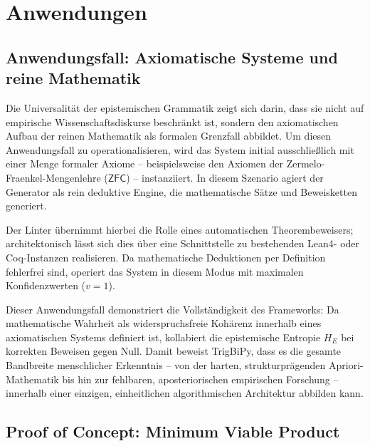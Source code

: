 \documentclass[11pt, a4paper]{article}
\begin{document}
	\section{Anwendungen}
	
	\subsection{Anwendungsfall: Axiomatische Systeme und reine Mathematik} \label{math}
	
	Die Universalität der epistemischen Grammatik zeigt sich darin, dass sie nicht auf empirische Wissenschaftsdiskurse beschränkt ist, sondern den axiomatischen Aufbau der reinen Mathematik als formalen Grenzfall abbildet. Um diesen Anwendungsfall zu operationalisieren, wird das System initial ausschließlich mit einer Menge formaler Axiome – beispielsweise den Axiomen der Zermelo-Fraenkel-Mengenlehre ($\mathsf{ZFC}$) – instanziiert. In diesem Szenario agiert der Generator als rein deduktive Engine, die mathematische Sätze und Beweisketten generiert.
	
	Der Linter übernimmt hierbei die Rolle eines automatischen Theorembeweisers; architektonisch lässt sich dies über eine Schnittstelle zu bestehenden Lean4- oder Coq-Instanzen realisieren. Da mathematische Deduktionen per Definition fehlerfrei sind, operiert das System in diesem Modus mit maximalen Konfidenzwerten ($v = 1$). 
	
	Dieser Anwendungsfall demonstriert die Vollständigkeit des Frameworks: Da mathematische Wahrheit als widerspruchsfreie Kohärenz innerhalb eines axiomatischen Systems definiert ist, kollabiert die epistemische Entropie $H_E$ bei korrekten Beweisen gegen Null. Damit beweist TrigBiPy, dass es die gesamte Bandbreite menschlicher Erkenntnis – von der harten, strukturprägenden Apriori-Mathematik bis hin zur fehlbaren, aposteriorischen empirischen Forschung – innerhalb einer einzigen, einheitlichen algorithmischen Architektur abbilden kann.
	
	
	\subsection{Proof of Concept: Minimum Viable Product}
	
\end{document}
